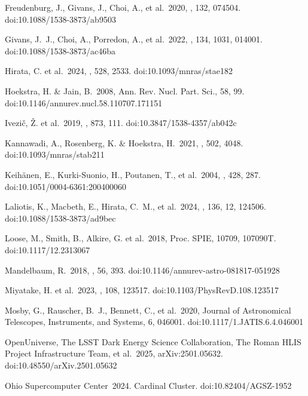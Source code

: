 \documentclass[]{pasj01}
\begin{document}
\begin{thebibliography}{}
 Freudenburg, J., Givans, J., Choi, A., et al.\ 2020, \pasp, 132, 074504. doi:10.1088/1538-3873/ab9503

 Givans, J.~J., Choi, A., Porredon, A., et al.\ 2022, \pasp, 134, 1031, 014001. doi:10.1088/1538-3873/ac46ba

 Hirata, C. et al.\ 2024, \mnras, 528, 2533. doi:10.1093/mnras/stae182

 Hoekstra, H. \& Jain, B.\ 2008, Ann. Rev. Nucl. Part. Sci., 58, 99. doi:10.1146/annurev.nucl.58.110707.171151

 Ivezi\v c, \v Z. et al.\ 2019, \apj, 873, 111. doi:10.3847/1538-4357/ab042c

 Kannawadi, A., Rosenberg, K. \& Hoekstra, H.\ 2021, \mnras, 502, 4048. doi:10.1093/mnras/stab211

 Keih{\"a}nen, E., Kurki-Suonio, H., Poutanen, T., et al.\ 2004, \aap, 428, 287. doi:10.1051/0004-6361:200400060

 Laliotis, K., Macbeth, E., Hirata, C.~M., et al.\ 2024, \pasp, 136, 12, 124506. doi:10.1088/1538-3873/ad9bec

 Loose, M., Smith, B., Alkire, G. et al.\ 2018, Proc. SPIE, 10709, 107090T. doi:10.1117/12.2313067

 Mandelbaum, R.\ 2018, \araa, 56, 393. doi:10.1146/annurev-astro-081817-051928

 Miyatake, H. et al.\ 2023, \prd, 108, 123517. doi:10.1103/PhysRevD.108.123517

 Mosby, G., Rauscher, B.~J., Bennett, C., et al.\ 2020, Journal of Astronomical Telescopes, Instruments, and Systems, 6, 046001. doi:10.1117/1.JATIS.6.4.046001

 OpenUniverse, The LSST Dark Energy Science Collaboration, The Roman HLIS Project Infrastructure Team, et al.\ 2025, arXiv:2501.05632. doi:10.48550/arXiv.2501.05632

 Ohio Supercomputer Center\ 2024. Cardinal Cluster. doi:10.82404/AGSZ-1952


\end{thebibliography}
\end{document}
